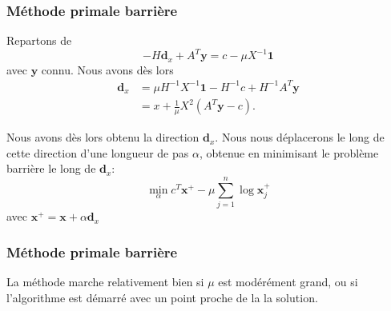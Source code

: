 \documentclass[usepdftitle=false, aspectratio=169]{beamer}
\def\bc{\boldsymbol{c}}
\def\bd{\boldsymbol{d}}
\def\bs{\boldsymbol{s}}
\def\bx{\boldsymbol{x}}
\def\by{\boldsymbol{y}}
\def\bA{\boldsymbol{A}}
\def\bX{\boldsymbol{X}}
\def\bzero{\boldsymbol{0}}
\def\bone{\boldsymbol{1}}
\begin{document}
\begin{frame}
\frametitle{Méthode primale barrière}

Repartons de
$$
-H\bd_x + A^T\by = c - \mu X^{-1}\bone
$$
avec $\by$ connu. Nous avons dès lors
\begin{align*}
\bd_x &= \mu H^{-1}X^{-1}\bone - H^{-1}c + H^{-1}A^T\by \\
&= x + \frac{1}{\mu}X^2(A^T\by-c).
\end{align*}

\mbox{}

Nous avons dès lors obtenu la direction $\bd_x$.
Nous nous déplacerons le long de cette direction d'une longueur de pas $\alpha$, obtenue en minimisant le problème barrière le long de $\bd_x$:
$$
\min_{\alpha} c^T\bx^+ - \mu \sum_{j = 1}^n \log \bx^+_j
$$
avec $\bx^+ = \bx+\alpha \bd_x$




\end{frame}

\begin{frame}
\frametitle{Méthode primale barrière}

La méthode marche relativement bien si $\mu$ est modérément grand, ou si l'algorithme est démarré avec un point proche de la la solution.



\end{frame}
\end{document}
